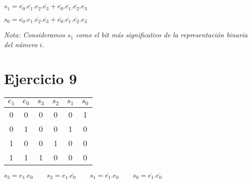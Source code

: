 $s_1 = \overline{e_0}.\overline{e_1}.e_2.\overline{e_3} + \overline{e_0}.\overline{e_1}.\overline{e_2}.e_3$

$s_0 = \overline{e_0}.e_1.\overline{e_2}.\overline{e_3} + \overline{e_0}.\overline{e_1}.\overline{e_2}.e_3$

\emph{Nota: Consideramos $s_1$ como el bit más significativo de la representación binaria del número $i$.}

\begin{figure}[ht]
    
\end{figure}

\pagebreak

\section{Ejercicio 9}

\begin{tabular}{|c|c||c|c|c|c|}
    $e_1$ & $e_0$ & $s_3$ & $s_2$ & $s_1$ & $s_0$ \\
    \hline
    0 & 0 & 0 & 0 & 0 & 1 \\
    0 & 1 & 0 & 0 & 1 & 0 \\
    1 & 0 & 0 & 1 & 0 & 0 \\
    1 & 1 & 1 & 0 & 0 & 0 \\
\end{tabular}

$
s_3 = e_1.e_0
\hspace{2em}
s_2 = e_1.\overline{e_0}
\hspace{2em}
s_1 = \overline{e_1}.e_0
\hspace{2em}
s_0 = \overline{e_1}.\overline{e_0}
$

\begin{figure}[ht]
    
\end{figure}


